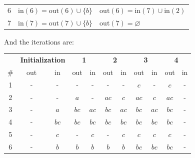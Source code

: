 \begin{enumerate}
\begin{table}[H]
\begin{tabular}{|c|l|l|}
            6             & $\text{in}(6)=\text{out}(6)\cup\{b\}$                      & $\text{out}(6)=\text{in}(7)\cup\text{in}(2)$               \\
            7             & $\text{in}(7)=\text{out}(7)\cup\{b\}$                      & $\text{out}(7)=\varnothing$                                \\ \hline
            \end{tabular}
        \end{table}
        And the iterations are: 
        \begin{table}[H]
            \centering
            \begin{tabular}{ccccccccccc}
            \textbf{}                 & \multicolumn{2}{c}{\textbf{Initialization}} & \multicolumn{2}{c}{\textbf{1}}   & \multicolumn{2}{c}{\textbf{2}}   & \multicolumn{2}{c}{\textbf{3}}   & \multicolumn{2}{c}{\textbf{4}} \\
            \multicolumn{1}{c|}{$\#$} & out       & \multicolumn{1}{c|}{in}         & out  & \multicolumn{1}{c|}{in}   & out  & \multicolumn{1}{c|}{in}   & out  & \multicolumn{1}{c|}{in}   & out             & in           \\ \hline
            \multicolumn{1}{c|}{1}    & -         & \multicolumn{1}{c|}{-}          & -    & \multicolumn{1}{c|}{-}    & -    & \multicolumn{1}{c|}{-}    & $c$  & \multicolumn{1}{c|}{-}    & $c$             & -            \\
            \multicolumn{1}{c|}{2}    & -         & \multicolumn{1}{c|}{-}          & $a$  & \multicolumn{1}{c|}{-}    & $ac$ & \multicolumn{1}{c|}{$c$}  & $ac$ & \multicolumn{1}{c|}{$c$}  & $ac$            & -            \\
            \multicolumn{1}{c|}{3}    & -         & \multicolumn{1}{c|}{$a$}        & $bc$ & \multicolumn{1}{c|}{$ac$} & $bc$ & \multicolumn{1}{c|}{$ac$} & $bc$ & \multicolumn{1}{c|}{$ac$} & $bc$            & -            \\
            \multicolumn{1}{c|}{4}    & -         & \multicolumn{1}{c|}{$bc$}       & $bc$ & \multicolumn{1}{c|}{$bc$} & $bc$ & \multicolumn{1}{c|}{$bc$} & $bc$ & \multicolumn{1}{c|}{$bc$} & $bc$            & -            \\
            \multicolumn{1}{c|}{5}    & -         & \multicolumn{1}{c|}{$ c$}       & -    & \multicolumn{1}{c|}{$ c$} & -    & \multicolumn{1}{c|}{$ c$} & $ c$ & \multicolumn{1}{c|}{$ c$} & $ c$            & -            \\
            \multicolumn{1}{c|}{6}    & -         & \multicolumn{1}{c|}{$b$}        & $b$  & \multicolumn{1}{c|}{$b$}  & $b$  & \multicolumn{1}{c|}{$b$}  & $bc$ & \multicolumn{1}{c|}{$bc$} & $bc$            & -            \\

\end{tabular}
\end{table}
\end{enumerate}
